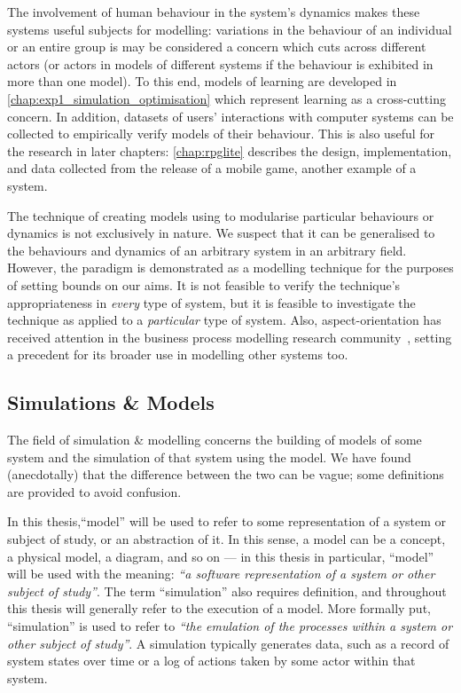 The involvement of human behaviour in the system's dynamics makes these systems
useful subjects for \aspectoriented{} modelling: variations in the behaviour of
an individual or an entire group is may be considered a concern which cuts
across different actors (or actors in models of different systems if the
behaviour is exhibited in more than one model). To this end, models of learning
are developed in \cref{chap:exp1_simulation_optimisation} which represent
learning as a cross-cutting concern. In addition, datasets of users'
interactions with computer systems can be collected to empirically verify
\sociotechnical{} models of their behaviour. This is also useful for the
research in later chapters: \cref{chap:rpglite} describes the design,
implementation, and data collected from the release of a mobile game, another
example of a \sociotechnical system.

The technique of creating models using \aspectorientation to modularise
particular behaviours or dynamics is not exclusively \sociotechnical in nature.
We suspect that it can be generalised to the behaviours and dynamics
of an arbitrary system in an arbitrary field. However, the paradigm is
demonstrated as a \sociotechnical modelling technique for the purposes of
setting bounds on our aims. It is not feasible to verify the
technique's appropriateness in \emph{every} type of system, but it is feasible to
investigate the technique as applied to a \emph{particular} type of system.
Also, aspect-orientation has received attention in the business process
modelling research
community~\cite{charfi2007ao4bpel,Cappelli_AOBPM,Charfi2006AspectOrientedWL},
setting a precedent for its broader use in modelling other \sociotechnical
systems too.


\subsection{Simulations \& Models}

The field of simulation \& modelling concerns the building of models of some
system and the simulation of that system using the model. We have found
(anecdotally) that the difference between the two can be vague; some definitions
are provided to avoid confusion.

In this thesis,``model'' will be used to refer to some representation of a
system or subject of study, or an abstraction of it. In this sense, a model can
be a concept, a physical model, a diagram, and so on --- in this thesis in
particular, ``model'' will be used with the meaning: \emph{``a software
  representation of a system or other subject of study''}. The term
``simulation'' also requires definition, and throughout this thesis will
generally refer to the execution of a model. More formally put, ``simulation''
is used to refer to \emph{``the emulation of the processes within a system or
  other subject of study''}. A simulation typically generates data, such as a
record of system states over time or a log of actions taken by some actor within
that system.

